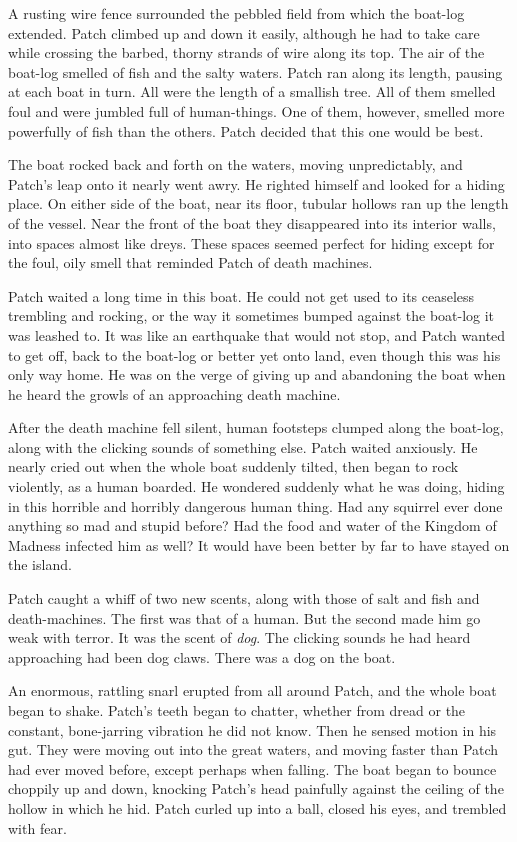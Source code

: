 \documentclass[12pt]{book}
\begin{document}
A rusting wire fence surrounded the pebbled field from which the boat-log extended. Patch climbed up and down it easily, although he had to take care while crossing the barbed, thorny strands of wire along its top. The air of the boat-log smelled of fish and the salty waters. Patch ran along its length, pausing at each boat in turn. All were the length of a smallish tree. All of them smelled foul and were jumbled full of human-things. One of them, however, smelled more powerfully of fish than the others. Patch decided that this one would be best.

The boat rocked back and forth on the waters, moving unpredictably, and Patch's leap onto it nearly went awry. He righted himself and looked for a hiding place. On either side of the boat, near its floor, tubular hollows ran up the length of the vessel. Near the front of the boat they disappeared into its interior walls, into spaces almost like dreys. These spaces seemed perfect for hiding %
except for the foul, oily smell that reminded Patch of death machines.

Patch waited a long time in this boat. He could not get used to its ceaseless trembling and rocking, or the way it sometimes bumped against the boat-log it was leashed to. It was like an earthquake that would not stop, and Patch wanted to get off, back to the boat-log or better yet onto land, even though this was his only way home. He was on the verge of giving up and abandoning the boat when he heard the growls of an approaching death machine.

After the death machine fell silent, human footsteps clumped along the boat-log, along with the clicking sounds of something else. Patch waited anxiously. He nearly cried out when the whole boat suddenly tilted, then began to rock violently, as a human boarded. He wondered suddenly what he was doing, hiding in this horrible and horribly dangerous human thing. Had any squirrel ever done anything so mad and stupid before? Had the food and water of the Kingdom of Madness infected him as well? It would have been better by far to have stayed on the island.

Patch caught a whiff of two new scents, along with those of salt and fish and death-machines. The first was that of a human. But the second made him go weak with terror. It was the scent of {\it dog}. The clicking sounds he had heard approaching had been dog claws. There was a dog on the boat.

An enormous, rattling snarl erupted from all around Patch, and the whole boat began to shake. Patch's teeth began to chatter, whether from dread or the constant, bone-jarring vibration he did not know. Then he sensed motion in his gut. They were moving out into the great waters, and moving faster than Patch had ever moved before, except perhaps when falling. The boat began to bounce choppily up and down, knocking Patch's head painfully against the ceiling of the hollow in which he hid. Patch curled up into a ball, closed his eyes, and trembled with fear.
\end{document}
